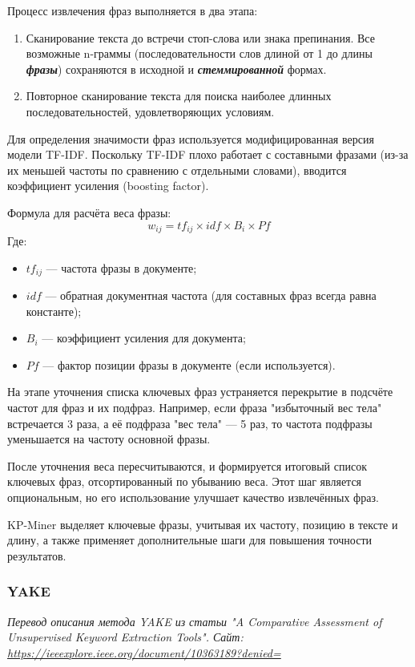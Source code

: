 \documentclass[bachelor, och, diploma ]{SCWorks}
\begin{document}
Процесс извлечения фраз выполняется в два этапа:  

\begin{enumerate}
    \item Сканирование текста до встречи стоп-слова или знака препинания. Все возможные n-граммы (последовательности слов длиной от 1 до длины \textit{\textbf{фразы}}) сохраняются в исходной и \textit{\textbf{стеммированной}} формах. 
    \item Повторное сканирование текста для поиска наиболее длинных последовательностей, удовлетворяющих условиям.  
\end{enumerate}



Для определения значимости фраз используется модифицированная версия модели TF-IDF. Поскольку TF-IDF плохо работает с составными фразами (из-за их меньшей частоты по сравнению с отдельными словами), вводится коэффициент усиления (boosting factor).  

Формула для расчёта веса фразы:  
\[ w_{ij} = tf_{ij} \times idf \times B_i \times Pf \]  
Где:  
\begin{itemize}
    \item \( tf_{ij} \) — частота фразы в документе;
    \item \( idf \) — обратная документная частота (для составных фраз всегда равна константе);
    \item \( B_i \) — коэффициент усиления для документа;
    \item \( Pf \) — фактор позиции фразы в документе (если используется).  
\end{itemize}

На этапе уточнения списка ключевых фраз устраняется перекрытие в подсчёте частот для фраз и их подфраз. Например, если фраза "избыточный вес тела" встречается 3 раза, а её подфраза "вес тела" — 5 раз, то частота подфразы уменьшается на частоту основной фразы.  

После уточнения веса пересчитываются, и формируется итоговый список ключевых фраз, отсортированный по убыванию веса. Этот шаг является опциональным, но его использование улучшает качество извлечённых фраз.  


KP-Miner выделяет ключевые фразы, учитывая их частоту, позицию в тексте и длину, а также применяет дополнительные шаги для повышения точности результатов.




\subsubsection{YAKE}
\textit{Перевод описания метода YAKE из статьи "A Comparative Assessment of Unsupervised Keyword Extraction Tools". Сайт: \url{https://ieeexplore.ieee.org/document/10363189?denied=}}
\end{document}
